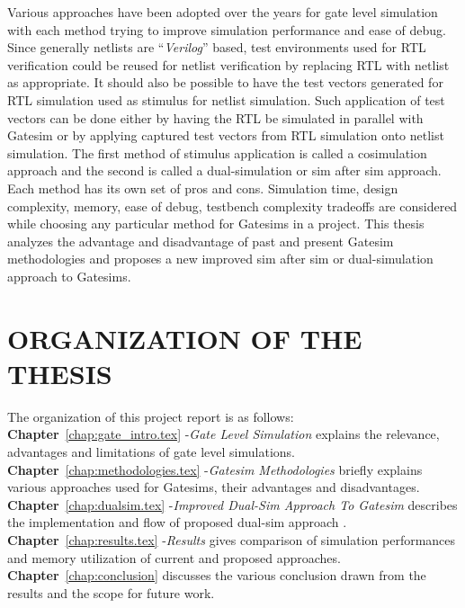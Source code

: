 Various approaches have been adopted over the years for gate level simulation with each method trying to improve simulation performance and ease of debug. Since generally netlists are ``{\it Verilog}'' based, test environments used for RTL verification could be reused for netlist verification by replacing RTL with netlist as appropriate. It should also be possible to have the test vectors generated for RTL simulation used as stimulus for netlist simulation. Such application of test vectors can be done either by having the RTL be simulated in parallel with Gatesim or by applying captured test vectors from RTL simulation onto netlist simulation. The first method of stimulus application is called a cosimulation approach and the second is called a dual-simulation or sim after sim approach. Each method has its own set of pros and cons. Simulation time, design complexity, memory, ease of debug, testbench complexity tradeoffs are considered while choosing any particular method for Gatesims in a project. This thesis analyzes the advantage and disadvantage of past and present Gatesim methodologies and  proposes a new improved sim after sim or dual-simulation approach to Gatesims. 



\section{ORGANIZATION OF THE THESIS}
The organization of this project report is as follows:\\
\noindent 
{\bf Chapter}~\ref{chap:gate_intro.tex} -{\it Gate Level Simulation} explains the relevance, advantages and limitations of gate level simulations.\\
{\bf Chapter}~\ref{chap:methodologies.tex} -{\it Gatesim Methodologies} briefly explains various approaches used for Gatesims, their advantages and disadvantages.\\
{\bf Chapter}~\ref{chap:dualsim.tex} -{\it Improved Dual-Sim Approach To Gatesim} describes the implementation and flow of proposed dual-sim approach .\\
{\bf Chapter}~\ref{chap:results.tex} -{\it Results} gives comparison of simulation performances and memory utilization of current and proposed approaches.\\
{\bf Chapter}~\ref{chap:conclusion} discusses the various conclusion drawn from the results and the scope for future work.
